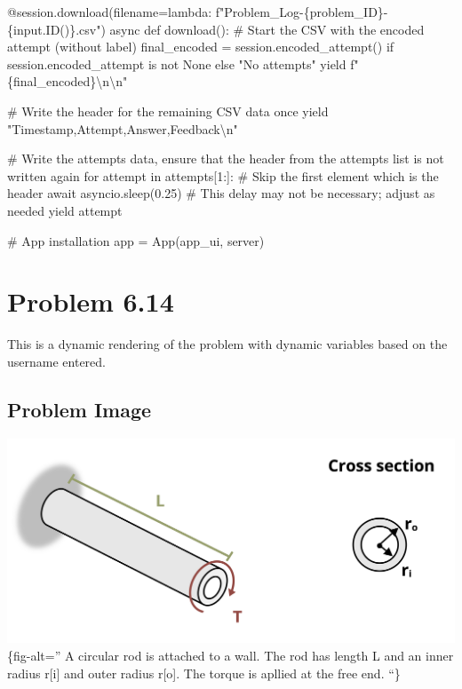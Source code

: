 \documentclass[
  letterpaper,
  DIV=11,
  numbers=noendperiod]{scrreprt}
\newenvironment{Shaded}{\begin{snugshade}}{\end{snugshade}}
\newcommand{\NormalTok}[1]{\textcolor[rgb]{0.00,0.23,0.31}{#1}}
\begin{document}
\begin{Shaded}
\begin{Highlighting}[]
\NormalTok{    @session.download(filename=lambda: f"Problem\_Log{-}\{problem\_ID\}{-}\{input.ID()\}.csv")}
\NormalTok{    async def download():}
\NormalTok{        \# Start the CSV with the encoded attempt (without label)}
\NormalTok{        final\_encoded = session.encoded\_attempt() if session.encoded\_attempt is not None else "No attempts"}
\NormalTok{        yield f"\{final\_encoded\}\textbackslash{}n\textbackslash{}n"}
        
\NormalTok{        \# Write the header for the remaining CSV data once}
\NormalTok{        yield "Timestamp,Attempt,Answer,Feedback\textbackslash{}n"}
        
\NormalTok{        \# Write the attempts data, ensure that the header from the attempts list is not written again}
\NormalTok{        for attempt in attempts[1:]:  \# Skip the first element which is the header}
\NormalTok{            await asyncio.sleep(0.25)  \# This delay may not be necessary; adjust as needed}
\NormalTok{            yield attempt}


\NormalTok{\# App installation}
\NormalTok{app = App(app\_ui, server)}
\end{Highlighting}
\end{Shaded}

\chapter*{Problem 6.14}\label{problem-6.14}


This is a dynamic rendering of the problem with dynamic variables based
on the username entered.

\section*{Problem Image}\label{problem-image-44}


\includegraphics{images/270.png}\{fig-alt='' A circular rod is attached
to a wall. The rod has length L and an inner radius r{[}i{]} and outer
radius r{[}o{]}. The torque is apllied at the free end. ``\}
\end{document}
